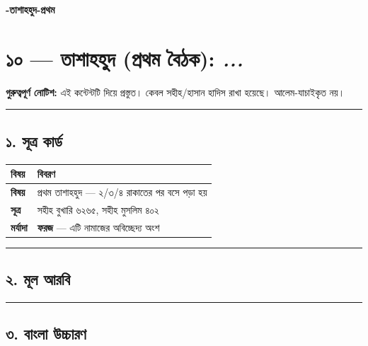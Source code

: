 

\begin{center}{\Large\bfseries\color{emerald} -তাশাহহুদ-প্রথম}\end{center}
\vspace{1em}
\section*{১০ — তাশাহহুদ (প্রথম বৈঠক): \textit{...}}

\begin{warnbox}
 \textbf{গুরুত্বপূর্ণ নোটিশ:} এই কন্টেন্টটি  দিয়ে প্রস্তুত। কেবল সহীহ/হাসান হাদিস রাখা হয়েছে। আলেম-যাচাইকৃত নয়।
\end{warnbox}

\medskip\hrule\medskip

\subsection*{১. সূত্র কার্ড}

\begin{table}[h]\centering\small
\begin{tabular}{ll}
বিষয় & বিবরণ \\
\hline
\textbf{বিষয়} & প্রথম তাশাহহুদ — ২/৩/৪ রাকাতের পর বসে পড়া হয় \\
\textbf{সূত্র} & সহীহ বুখারি ৬২৬৫, সহীহ মুসলিম ৪০২ \\
\textbf{মর্যাদা} & \textbf{ফরজ} — এটি নামাজের অবিচ্ছেদ্য অংশ \\
\hline
\end{tabular}
\end{table}

\medskip\hrule\medskip

\subsection*{২. মূল আরবি}

\begin{center}\end{center}

\medskip\hrule\medskip

\subsection*{৩. বাংলা উচ্চারণ}

